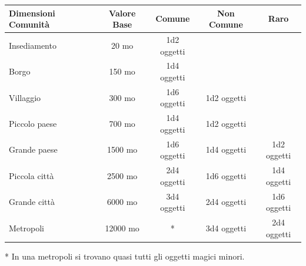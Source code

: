 \bigskip


\begin{tabularx}{0.95\textwidth}{lcccc}
\textbf{Dimensioni Comunità} & \textbf{Valore Base} & \textbf{Comune} & \textbf{Non Comune} & \textbf{Raro}\\
\toprule
Insediamento& 20 mo & 1d2 oggetti && \\
Borgo & 150 mo& 1d4 oggetti && \\
Villaggio & 300 mo& 1d6 oggetti & 1d2 oggetti& \\
Piccolo paese & 700 mo & 1d4 oggetti & 1d2 oggetti& \\
Grande paese& 1500 mo & 1d6 oggetti & 1d4 oggetti& 1d2 oggetti\\
Piccola città & 2500 mo & 2d4 oggetti & 1d6 oggetti& 1d4 oggetti\\
Grande città& 6000 mo & 3d4 oggetti& 2d4 oggetti& 1d6 oggetti\\
Metropoli & 12000 mo& {*} & 3d4 oggetti& 2d4 oggetti
\end{tabularx}

{*} In una metropoli si trovano quasi tutti gli oggetti magici minori.

